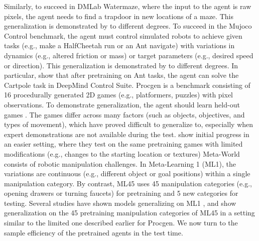 \documentclass{article}
\begin{document}
Similarly, to succeed in DMLab Watermaze, where the input to the agent is raw pixels,
the agent needs to find a trapdoor in new locations of a maze.
This generalization is demonstrated by
\citet{laskinContextReinforcementLearning2022,zismanEmergenceContextReinforcement2023,shiCrossEpisodicCurriculumTransformer2023,ritterBeenThereDone2018} to different degrees.
To succeed in the Mujoco Control benchmark,
the agent must control simulated robots to achieve given tasks (e.g., make a HalfCheetah run or an Ant navigate)
with variations in
dynamics (e.g., altered friction or mass) or target parameters (e.g., desired speed or direction).
This generalization is demonstrated by
\citet{xuPromptingDecisionTransformer2022,wangHierarchicalPromptDecision2024,grigsbyAMAGOScalableContext2024,mishraSimpleNeuralAttentive2018,meloTransformersAreMetaReinforcement2022,kirschGeneralPurposeContextLearning2023} to different degrees.
In particular,
\citet{kirschGeneralPurposeContextLearning2023} show that after pretraining on Ant tasks,
the agent can solve the Cartpole task in DeepMind Control Suite.
Procgen is a benchmark consisting of 16 procedurally generated 2D games (e.g., platformers, puzzles) with pixel observations. To demonstrate generalization, the agent should learn held-out games \citep{raparthyGeneralizationNewSequential2023}. The games differ across many factors (such as objects, objectives, and types of movement), which have proved difficult to generalize to,
especially when expert demonstrations are not available during the test.
\citet{grigsbyAMAGO2BreakingMultiTask2024,schmiedLargeRecurrentAction2024} show initial progress in an easier setting,
where they test
on the same pretraining games with limited modifications (e.g., changes to the starting location or textures)
Meta-World consists of robotic manipulation challenges.
In Meta-Learning 1 (ML1), the variations are continuous (e.g., different object or goal positions) within a single manipulation category.
By contrast, ML45 uses 45 manipulation categories (e.g., opening drawers or turning faucets) for pretraining and 5 new categories for testing. Several studies have shown models generalizing on ML1 \citep{xuPromptingDecisionTransformer2022,wangHierarchicalPromptDecision2024,grigsbyAMAGOScalableContext2024,mishraSimpleNeuralAttentive2018,meloTransformersAreMetaReinforcement2022}, and \citet{grigsbyAMAGO2BreakingMultiTask2024} show generalization on the 45 pretraining manipulation categories of ML45 in a setting similar to the limited one described earlier for Procgen.
We now turn to the sample efficiency of the pretrained agents in the test time.
\end{document}
